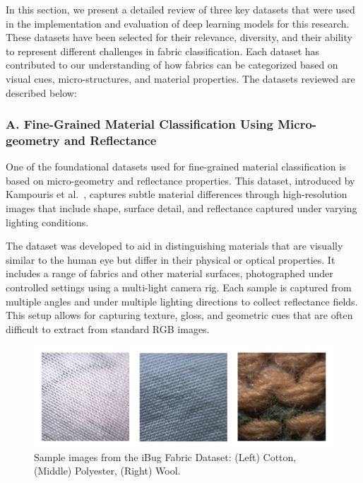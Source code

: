 In this section, we present a detailed review of three key datasets that were used in the implementation and evaluation of deep learning models for this research. These datasets have been selected for their relevance, diversity, and their ability to represent different challenges in fabric classification. Each dataset has contributed to our understanding of how fabrics can be categorized based on visual cues, micro-structures, and material properties. The datasets reviewed are described below:

\newpage

\subsubsection{A. Fine-Grained Material Classification Using Micro-geometry and Reflectance}

One of the foundational datasets used for fine-grained material classification is based on micro-geometry and reflectance properties. This dataset, introduced by Kampouris et al.~\cite{kampouris2016fine}, captures subtle material differences through high-resolution images that include shape, surface detail, and reflectance captured under varying lighting conditions.

The dataset was developed to aid in distinguishing materials that are visually similar to the human eye but differ in their physical or optical properties. It includes a range of fabrics and other material surfaces, photographed under controlled settings using a multi-light camera rig. Each sample is captured from multiple angles and under multiple lighting directions to collect reflectance fields. This setup allows for capturing texture, gloss, and geometric cues that are often difficult to extract from standard RGB images.

\begin{figure}[H]
    \centering
    \begin{minipage}{0.8\linewidth}
        \includegraphics[width=\linewidth]{images/iBugDataset}
    \end{minipage}
    \caption[Sample images from the iBug Fabric Dataset]{Sample images from the iBug Fabric Dataset: (Left) Cotton, (Middle) Polyester, (Right) Wool.}
\end{figure}

